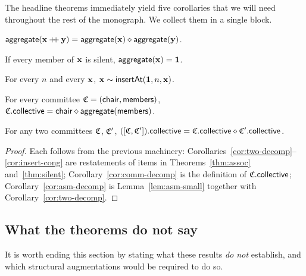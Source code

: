 The headline theorems immediately yield five corollaries that we
will need throughout the rest of the monograph. We collect them in a
single block.

\begin{corollary}\label{cor:two-decomp}
$\mathsf{aggregate}(\mathbf{x} \mathbin{+\!\!+} \mathbf{y}) = \mathsf{aggregate}(\mathbf{x}) \mathbin{\diamond} \mathsf{aggregate}(\mathbf{y})$.
\end{corollary}

\begin{corollary}\label{cor:trivial-collapse}
If every member of $\mathbf{x}$ is silent, $\mathsf{aggregate}(\mathbf{x}) = \mathbf{1}$.
\end{corollary}

\begin{corollary}\label{cor:insert-cong}
For every $n$ and every $\mathbf{x}$, $\mathbf{x} \sim \mathsf{insertAt}(\mathbf{1}, n, \mathbf{x})$.
\end{corollary}

\begin{corollary}\label{cor:comm-decomp}
For every committee $\mathfrak{C} = (\mathsf{chair}, \mathsf{members})$,
$\mathfrak{C}.\mathsf{collective} = \mathsf{chair} \mathbin{\diamond} \mathsf{aggregate}(\mathsf{members})$.
\end{corollary}

\begin{corollary}\label{cor:asm-decomp}
For any two committees $\mathfrak{C}$, $\mathfrak{C}'$,
$([\mathfrak{C}, \mathfrak{C}']).\mathsf{collective} = \mathfrak{C}.\mathsf{collective} \mathbin{\diamond}
\mathfrak{C}'.\mathsf{collective}$.
\end{corollary}

\begin{proof}
Each follows from the previous machinery:
Corollaries~\ref{cor:two-decomp}--\ref{cor:insert-cong} are restatements
of items in Theorems~\ref{thm:assoc} and~\ref{thm:silent};
Corollary~\ref{cor:comm-decomp} is the definition of $\mathfrak{C}.\mathsf{collective}$;
Corollary~\ref{cor:asm-decomp} is Lemma~\ref{lem:asm-small} together
with Corollary~\ref{cor:two-decomp}.
\end{proof}

\subsection*{What the theorems do not say}

It is worth ending this section by stating what these results
\emph{do not} establish, and which structural augmentations would be
required to do so.


